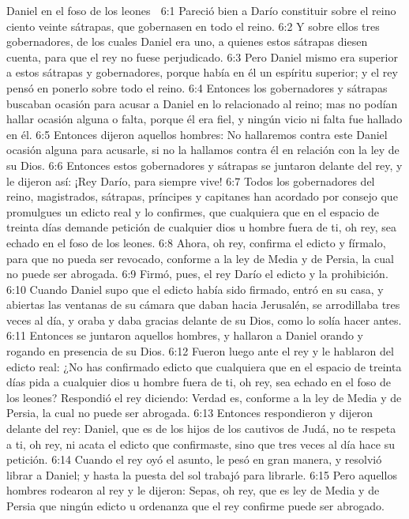 Daniel en el foso de los leones  

6:1 Pareció bien a Darío constituir sobre el reino ciento veinte sátrapas, que gobernasen en todo el reino.  
6:2 Y sobre ellos tres gobernadores, de los cuales Daniel era uno, a quienes estos sátrapas diesen cuenta, para que el rey no fuese perjudicado.  
6:3 Pero Daniel mismo era superior a estos sátrapas y gobernadores, porque había en él un espíritu superior; y el rey pensó en ponerlo sobre todo el reino.  
6:4 Entonces los gobernadores y sátrapas buscaban ocasión para acusar a Daniel en lo relacionado al reino; mas no podían hallar ocasión alguna o falta, porque él era fiel, y ningún vicio ni falta fue hallado en él.  
6:5 Entonces dijeron aquellos hombres: No hallaremos contra este Daniel ocasión alguna para acusarle, si no la hallamos contra él en relación con la ley de su Dios.  
6:6 Entonces estos gobernadores y sátrapas se juntaron delante del rey, y le dijeron así: ¡Rey Darío, para siempre vive!  
6:7 Todos los gobernadores del reino, magistrados, sátrapas, príncipes y capitanes han acordado por consejo que promulgues un edicto real y lo confirmes, que cualquiera que en el espacio de treinta días demande petición de cualquier dios u hombre fuera de ti, oh rey, sea echado en el foso de los leones.  
6:8 Ahora, oh rey, confirma el edicto y fírmalo, para que no pueda ser revocado, conforme a la ley de Media y de Persia, la cual no puede ser abrogada.  
6:9 Firmó, pues, el rey Darío el edicto y la prohibición.  
6:10 Cuando Daniel supo que el edicto había sido firmado, entró en su casa, y abiertas las ventanas de su cámara que daban hacia Jerusalén, se arrodillaba tres veces al día, y oraba y daba gracias delante de su Dios, como lo solía hacer antes.  
6:11 Entonces se juntaron aquellos hombres, y hallaron a Daniel orando y rogando en presencia de su Dios.  
6:12 Fueron luego ante el rey y le hablaron del edicto real: ¿No has confirmado edicto que cualquiera que en el espacio de treinta días pida a cualquier dios u hombre fuera de ti, oh rey, sea echado en el foso de los leones? Respondió el rey diciendo: Verdad es, conforme a la ley de Media y de Persia, la cual no puede ser abrogada.  
6:13 Entonces respondieron y dijeron delante del rey: Daniel, que es de los hijos de los cautivos de Judá, no te respeta a ti, oh rey, ni acata el edicto que confirmaste, sino que tres veces al día hace su petición.  
6:14 Cuando el rey oyó el asunto, le pesó en gran manera, y resolvió librar a Daniel; y hasta la puesta del sol trabajó para librarle.  
6:15 Pero aquellos hombres rodearon al rey y le dijeron: Sepas, oh rey, que es ley de Media y de Persia que ningún edicto u ordenanza que el rey confirme puede ser abrogado.  
